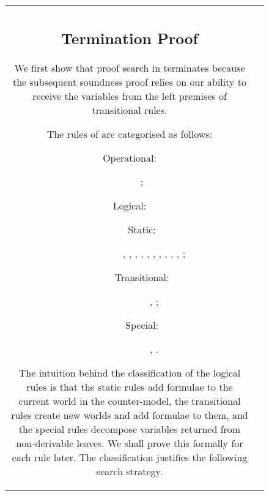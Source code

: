 \documentclass{llncs}
\numberwithin{equation}{section}
\begin{document}
\begin{figure}[t]
\begin{tabular}{cc}
\subsection{Termination Proof}\label{sec:termination}

We first show that proof search in  terminates because the subsequent soundness proof relies on our ability to receive the variables from the left premises of transitional rules.

\begin{definition}
The rules of  are categorised as follows:
	\begin{description}
		\item[Operational:] ;
		\item[Logical:] 
		\begin{description}
			\item[Static:] , , , , , , , , , , ;
			\item[Transitional:] , ;
			\item[Special:] , .			
		\end{description}
	\end{description}
\end{definition}

The intuition behind the classification of the logical rules is that the static rules add formulae to the current world in the counter-model, the transitional rules create new worlds and add formulae to them, and the special rules decompose variables returned from non-derivable leaves. We shall prove this formally for each rule later. The classification justifies the following search strategy.


\end{tabular}
\end{figure}
\end{document}
